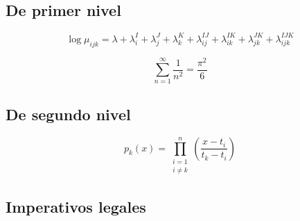 \documentclass[12pt]{report} %
\begin{document}
\lipsum[15]

\subsection{De primer nivel}
\lipsum[15-16]

\begin{equation} %
\log \mu_{ijk}= \lambda + \lambda_i ^I + \lambda_j ^J+\lambda_k ^K+\lambda_{ij} ^{IJ}+\lambda_{ik} ^{IK}+\lambda_{jk} ^{JK}+\lambda_{ijk} ^{IJK}
\end{equation}

\lipsum[17]
\begin{equation}
	\sum_{n=1}^\infty\frac{1}{n^2}=\frac{\pi^2}{6}
\end{equation}


\lipsum[18]
	
\subsection{De segundo nivel}
\lipsum[8]
\begin{equation}
p_k(x)=\prod_{\substack{i=1\\i\ne k}}^n
\left(\frac{x-t_i}{t_k-t_i}\right)
\end{equation}

\lipsum[9]

\subsection{Imperativos legales}
\lipsum[8]
\end{document}
